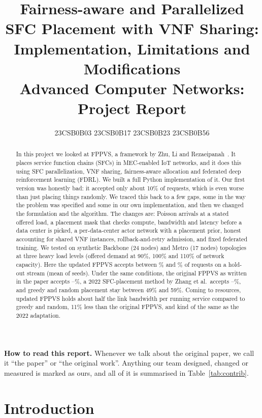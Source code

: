 \documentclass[11pt,a4paper]{article}
\title{\textbf{Fairness-aware and Parallelized SFC Placement with VNF Sharing:\\
Implementation, Limitations and Modifications}\\[4pt]
\large Advanced Computer Networks: Project Report}
\author{23CSB0B03 \quad 23CSB0B17 \quad 23CSB0B23 \quad 23CSB0B56}
\date{}
\begin{document}
\maketitle

\begin{abstract}
In this project we looked at FPPVS, a framework by Zhu, Li and
Rezaeipanah~\cite{fppvs}. It places service function chains (SFCs) in
MEC-enabled IoT networks, and it does this using SFC parallelization, VNF
sharing, fairness-aware allocation and federated deep reinforcement learning
(FDRL). We built a full Python implementation of it. Our first version was
honestly bad: it accepted only about 10\% of requests, which is even worse than
just placing things randomly. We traced this back to a few gaps, some in the way
the problem was specified and some in our own implementation, and then we
changed the formulation and the algorithm. The changes are: Poisson arrivals at
a stated offered load, a placement mask that checks compute, bandwidth and
latency before a data center is picked, a per-data-center actor network with a
placement prior, honest accounting for shared VNF instances, rollback-and-retry
admission, and fixed federated training. We tested on synthetic Backbone (24
nodes) and Metro (17 nodes) topologies at three heavy load levels (offered demand
at 90\%, 100\% and 110\% of network capacity). Here the updated FPPVS accepts
between \fppvsMinAcc\% and \fppvsMaxAcc\% of requests on a hold-out stream (mean
of \numSeeds{} seeds). Under the same conditions, the original FPPVS as written
in the paper accepts \origMinAcc--\origMaxAcc\%, a 2022 SFC-placement method by
Zhang et al.\ accepts \zhangMinAcc--\zhangMaxAcc\%, and greedy and random
placement stay between 49\% and 59\%. Coming to resources, updated FPPVS holds
about half the link bandwidth per running service compared to greedy and random,
11\% less than the original FPPVS, and kind of the same as the 2022 adaptation.
\end{abstract}

\noindent\textbf{How to read this report.} Whenever we talk about the original
paper, we call it ``the paper'' or ``the original work''. Anything our team
designed, changed or measured is marked as ours, and all of it is summarised in
Table~\ref{tab:contrib}.

\section{Introduction}
\end{document}
